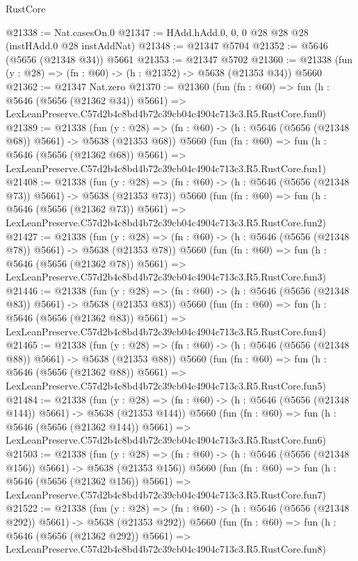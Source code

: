 \begin{lexlean}{RustCore}
\begin{coremodule}
@21338 := Nat.casesOn.{0}
@21347 := HAdd.hAdd.{0, 0, 0} @28 @28 @28 (instHAdd.{0} @28 instAddNat)
@21348 := @21347 @5704
@21352 := @5646 (@5656 (@21348 @34)) @5661
@21353 := @21347 @5702
@21360 := @21338 (fun (y : @28) => (fn : @60) -> (h : @21352) -> @5638 (@21353 @34)) @5660
@21362 := @21347 Nat.zero
@21370 := @21360
    (fun (fn : @60) =>
    fun (h : @5646 (@5656 (@21362 @34)) @5661) =>
    LexLeanPreserve.C57d2b4c8bd4b72c39cb04c4904c713c3.R5.RustCore.fun0)
@21389 := @21338
    (fun (y : @28) => (fn : @60) -> (h : @5646 (@5656 (@21348 @68)) @5661) -> @5638 (@21353 @68))
    @5660
    (fun (fn : @60) =>
    fun (h : @5646 (@5656 (@21362 @68)) @5661) =>
    LexLeanPreserve.C57d2b4c8bd4b72c39cb04c4904c713c3.R5.RustCore.fun1)
@21408 := @21338
    (fun (y : @28) => (fn : @60) -> (h : @5646 (@5656 (@21348 @73)) @5661) -> @5638 (@21353 @73))
    @5660
    (fun (fn : @60) =>
    fun (h : @5646 (@5656 (@21362 @73)) @5661) =>
    LexLeanPreserve.C57d2b4c8bd4b72c39cb04c4904c713c3.R5.RustCore.fun2)
@21427 := @21338
    (fun (y : @28) => (fn : @60) -> (h : @5646 (@5656 (@21348 @78)) @5661) -> @5638 (@21353 @78))
    @5660
    (fun (fn : @60) =>
    fun (h : @5646 (@5656 (@21362 @78)) @5661) =>
    LexLeanPreserve.C57d2b4c8bd4b72c39cb04c4904c713c3.R5.RustCore.fun3)
@21446 := @21338
    (fun (y : @28) => (fn : @60) -> (h : @5646 (@5656 (@21348 @83)) @5661) -> @5638 (@21353 @83))
    @5660
    (fun (fn : @60) =>
    fun (h : @5646 (@5656 (@21362 @83)) @5661) =>
    LexLeanPreserve.C57d2b4c8bd4b72c39cb04c4904c713c3.R5.RustCore.fun4)
@21465 := @21338
    (fun (y : @28) => (fn : @60) -> (h : @5646 (@5656 (@21348 @88)) @5661) -> @5638 (@21353 @88))
    @5660
    (fun (fn : @60) =>
    fun (h : @5646 (@5656 (@21362 @88)) @5661) =>
    LexLeanPreserve.C57d2b4c8bd4b72c39cb04c4904c713c3.R5.RustCore.fun5)
@21484 := @21338
    (fun (y : @28) => (fn : @60) -> (h : @5646 (@5656 (@21348 @144)) @5661) -> @5638 (@21353 @144))
    @5660
    (fun (fn : @60) =>
    fun (h : @5646 (@5656 (@21362 @144)) @5661) =>
    LexLeanPreserve.C57d2b4c8bd4b72c39cb04c4904c713c3.R5.RustCore.fun6)
@21503 := @21338
    (fun (y : @28) => (fn : @60) -> (h : @5646 (@5656 (@21348 @156)) @5661) -> @5638 (@21353 @156))
    @5660
    (fun (fn : @60) =>
    fun (h : @5646 (@5656 (@21362 @156)) @5661) =>
    LexLeanPreserve.C57d2b4c8bd4b72c39cb04c4904c713c3.R5.RustCore.fun7)
@21522 := @21338
    (fun (y : @28) => (fn : @60) -> (h : @5646 (@5656 (@21348 @292)) @5661) -> @5638 (@21353 @292))
    @5660
    (fun (fn : @60) =>
    fun (h : @5646 (@5656 (@21362 @292)) @5661) =>
    LexLeanPreserve.C57d2b4c8bd4b72c39cb04c4904c713c3.R5.RustCore.fun8)

\end{coremodule}
\end{lexlean}
